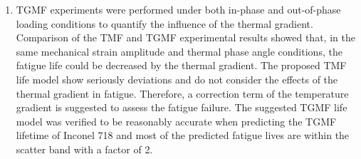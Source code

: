 \begin{enumerate}
\item TGMF experiments were performed under both in-phase and out-of-phase loading conditions to quantify the influence of the thermal gradient. Comparison of the TMF and TGMF experimental results showed that, in the same mechanical strain amplitude and thermal phase angle conditions, the fatigue life could be decreased by the thermal gradient. The proposed TMF life model show seriously deviations and do not consider the effects of the thermal gradient in fatigue. Therefore, a correction term of the temperature gradient is suggested to assess the fatigue failure. The suggested TGMF life model was verified to be reasonably accurate when predicting the TGMF lifetime of Inconel 718 and most of the predicted fatigue lives are within the scatter band with a factor of 2.
\end{enumerate}